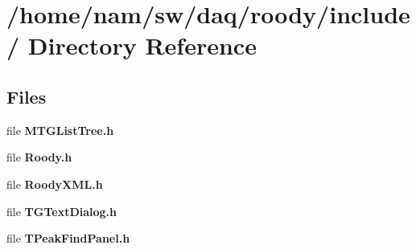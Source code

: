 \section{/home/nam/sw/daq/roody/include/ Directory Reference}
\label{dir_36090cc217820b1f4a76b73f6461e1dc}
\subsection*{Files}
\begin{DoxyCompactItemize}
\item 
file {\bf MTGListTree.h}
\item 
file {\bf Roody.h}
\item 
file {\bf RoodyXML.h}
\item 
file {\bf TGTextDialog.h}
\item 
file {\bf TPeakFindPanel.h}
\end{DoxyCompactItemize}
